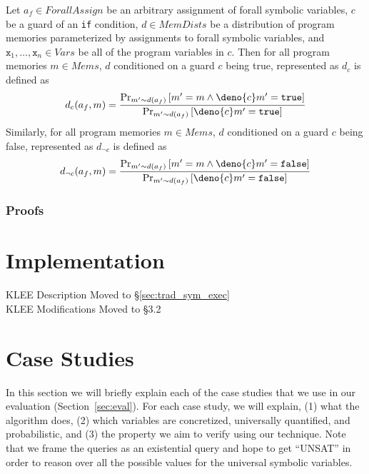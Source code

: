 \documentclass[acmsmall,review]{acmart}\settopmatter{}
\begin{document}
	\begin{definition}
		\label{def:cond}
		Let $a_f \in ForallAssign$ be an arbitrary assignment of forall symbolic variables, $c$ be a guard of an \texttt{if} condition, $d \in MemDists$ be a distribution of program memories parameterized by assignments to forall symbolic variables, and $\mathtt{x}_1,\ldots,\mathtt{x}_n \in Vars$ be all of the program variables in $c$. Then for all program memories $m \in Mems$, $d$ conditioned on a guard $c$ being true, represented as $d_c$ is defined as
		\[
		d_c(a_f,m) = \frac{\Pr_{m' \sim d(a_f)}\left[ m' = m \land \deno{c}m' = \mathtt{true} \right]}{\Pr_{m' \sim d(a_f)}\left[ \deno{c}m' = \mathtt{true} \right]}
		\]
		Similarly, for all program memories $m \in Mems$, $d$ conditioned on a guard $c$ being false, represented as $d_{\neg c}$ is defined as
		\[
		d_{\neg c}(a_f,m) = \frac{\Pr_{m' \sim d(a_f)}\left[ m' = m \land \deno{c}m' = \mathtt{false} \right]}{\Pr_{m' \sim d(a_f)}\left[ \deno{c}m' = \mathtt{false} \right]}
		\]
	\end{definition}
	
	\subsubsection{Proofs}
	\label{sec:proofs}
	
	\section{Implementation}
	\label{sec:implementation}
	
	{\color{red} KLEE Description Moved to \S\ref{sec:trad_sym_exec}} \\
	{\color{red} KLEE Modifications Moved to \S3.2} 
	
	\section{Case Studies}
	\label{sec:case_studies}
	In this section we will briefly explain each of the case studies that we use in our evaluation (Section~\ref{sec:eval}).
	For each case study, we will explain, (1) what the algorithm does, (2) which variables are concretized, universally quantified, and probabilistic, and (3) the property we aim to verify using our technique.
	Note that we frame the queries as an existential query and hope to get ``UNSAT'' in order to reason over all the possible values for the universal symbolic variables.
	
\end{document}
